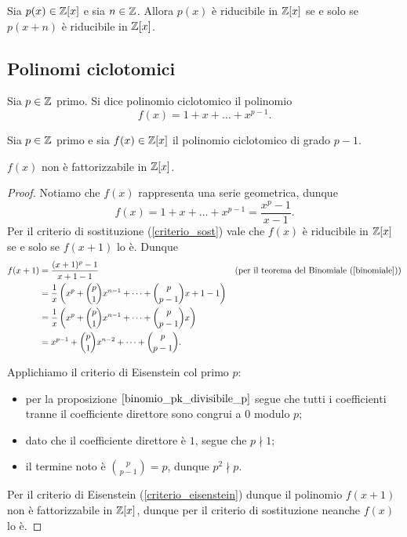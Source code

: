 \begin{proposition}
     \label{criterio_sost}
    Sia $p(x) \in \mathbb{Z}[x]$ e sia $n \in \mathbb{Z}$. Allora $p(x)$ è riducibile in $\mathbb{Z}[x]$ se e solo se $p(x+n)$ è riducibile in $\mathbb{Z}[x]$.
\end{proposition}

\subsection{Polinomi ciclotomici}

\begin{definition}
    Sia $p \in \mathbb{Z}$ primo. Si dice polinomio ciclotomico il polinomio \[
        f(x) = 1 + x + \dots + x^{p-1}.    
    \]
\end{definition}

\begin{proposition}
    Sia $p \in \mathbb{Z}$ primo e sia $f(x) \in \mathbb{Z}[x]$ il polinomio ciclotomico di grado $p-1$. 

    $f(x)$ non è fattorizzabile in $\mathbb{Z}[x]$.
\end{proposition}
\begin{proof}
    Notiamo che $f(x)$ rappresenta una serie geometrica, dunque \[
        f(x) = 1 + x + \dots + x^{p-1} = \frac{x^p - 1}{x - 1}.    
    \] Per il criterio di sostituzione (\ref{criterio_sost}) vale che $f(x)$ è riducibile in $\mathbb{Z}[x]$ se e solo se $f(x+1)$ lo è. Dunque
    \begin{align*}
        f(x+1) &= \frac{(x+1)^p - 1}{x+1-1} &&\text{(per il teorema del Binomiale (\ref{binomiale}))}\\
        &= \frac1x \left( x^p + \binom{p}{1}x^{n-1} + \dots + \binom{p}{p-1}x + 1 - 1 \right)\\
        &= \frac1x \left( x^p + \binom{p}{1}x^{n-1} + \dots + \binom{p}{p-1}x \right)\\
        &= x^{p-1} + \binom{p}{1}x^{n-2} + \dots + \binom{p}{p-1}.
    \end{align*}

    Applichiamo il criterio di Eisenstein col primo $p$:
    \begin{itemize}
        \item per la proposizione $\ref{binomio_pk_divisibile_p}$ segue che tutti i coefficienti tranne il coefficiente direttore sono congrui a $0$ modulo $p$;
        \item dato che il coefficiente direttore è $1$, segue che $p \nmid 1$;
        \item il termine noto è $\binom{p}{p-1} = p$, dunque $p^2 \nmid p$.
    \end{itemize}
    Per il criterio di Eisenstein (\ref{criterio_eisenstein}) dunque il polinomio $f(x+1)$ non è fattorizzabile in $\mathbb{Z}[x]$, dunque per il criterio di sostituzione neanche $f(x)$ lo è. 
\end{proof}